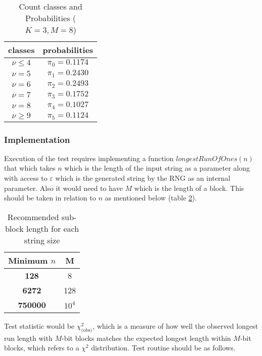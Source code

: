     \begin{table}[h!]
        \centering
        \begin{tabular}{|c|c|} \hline
            \textbf{classes} & \textbf{probabilities} \\ \hline
            \textbf{$\nu \leq 4$} & $\pi_0 = 0.1174$ \\ \hline
            \textbf{$\nu = 5$} & $\pi_1 = 0.2430$ \\ \hline
            \textbf{$\nu = 6$} & $\pi_2 = 0.2493$ \\ \hline
            \textbf{$\nu = 7$} & $\pi_3 = 0.1752$ \\ \hline
            \textbf{$\nu = 8$} & $\pi_4 = 0.1027$ \\ \hline
            \textbf{$\nu  \geq 9$} & $\pi_5 = 0.1124$ \\ \hline
        \end{tabular}
        \caption{Count classes and Probabilities ($K=3, M=8$)}
        \label{tab:class_prob_38}
    \end{table}

\subsubsection{Implementation}

Execution of the test requires implementing a function $longestRunOfOnes(n)$ that which takes $n$ which is the length of the input string as a parameter along with access to $\varepsilon$ which is the generated string by the RNG as an internal parameter. Also it would need to have $M$ which is the length of a block. This should be taken in relation to $n$ as mentioned below (table \ref{tab:sb_length_for_n}).

    \begin{table}[h!]
        \centering
        \begin{tabular}{|c|c|} \hline
             \textbf{Minimum $n$} & \textbf{M}  \\ \hline
             \textbf{128} & 8 \\ \hline
             \textbf{6272} & 128 \\ \hline
             \textbf{750000} & $10^4$ \\ \hline
        \end{tabular}
        \caption{Recommended sub-block length for each string size}
        \label{tab:sb_length_for_n}
    \end{table}
    
Test statistic would be $\chi^2_\text{(obs)}$, which is a measure of how well the observed longest run length with $M$-bit blocks matches the expected longest length within $M$-bit blocks, which refers to a $\chi^2$ distribution. Test routine should be as follows.

